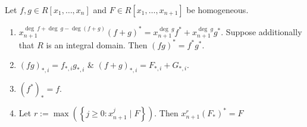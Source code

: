 \begin{proposition}
    Let $f,g\in R[x_1,\dots,x_n]$ and $F\in R[x_1,\dots,x_{n+1}]$ be homogeneous.
    \begin{enumerate}
        \item $x_{n+1}^{\deg\ f +\deg \ g - \deg( f+g)}(f+g)^\ast=x_{n+1}^{\deg\ g}f^\ast + x_{n+1}^{\deg\ g}g^\ast$. Suppose additionally that $R$ is an integral domain. Then $(fg)^\ast=f^\ast g^\ast$.
        \item $(fg)_{\ast,i} = f_{\ast,i} g_{\ast,i}$ \& $(f+g)_{\ast,i} = F_{\ast,i}+G_{\ast,i}$. 
        \item $(f^\ast)_\ast = f$.
        \item Let $r:=\max\left(\left\{ j\geq0: x_{n+1}^j\mid F \right\}\right).$ Then $x_{n+1}^r(F_\ast)^\ast=F$
    \end{enumerate}
\end{proposition}
